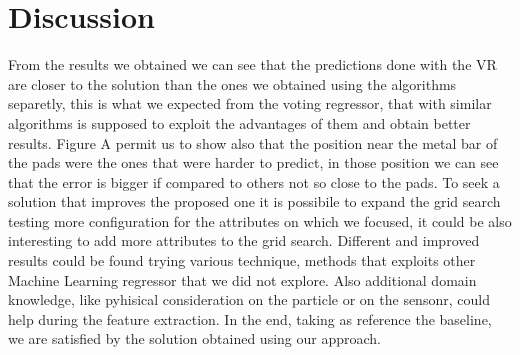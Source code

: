 \documentclass[conference]{IEEEtran}
\begin{document}
\section{Discussion}
From the results we obtained we can see that the predictions done with the VR are closer to the solution than the ones we obtained using the algorithms separetly, this is what we expected from the voting regressor, that with similar algorithms is supposed to exploit the advantages of them and obtain better results.
Figure A permit us to show also that the position near the metal bar of the pads were the ones that were harder to predict, in those position we can see that the error is bigger if compared to others not so close to the pads.
To seek a solution that improves the proposed one it is possibile to expand the grid search testing more configuration for the attributes on which we focused, it could be also interesting to add more attributes to the grid search. 
Different and improved results could be found trying various technique, methods that exploits other Machine Learning regressor that we did not explore.
Also additional domain knowledge, like pyhisical consideration on the particle or on the sensonr, could help during the feature extraction.
In the end, taking as reference the baseline, we are satisfied by the solution obtained using our approach.




\end{document}
